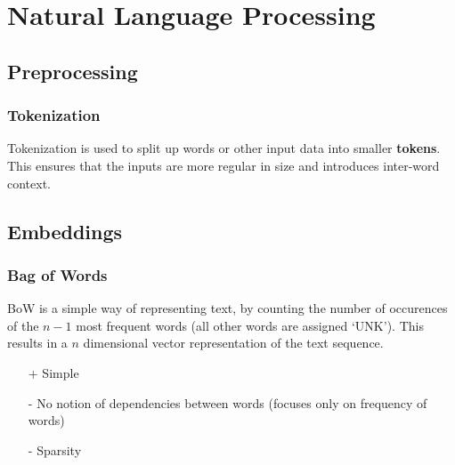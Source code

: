 \section{Natural Language Processing}
\subsection{Preprocessing}
\subsubsection{Tokenization}
Tokenization is used to split up words or other input data into smaller \textbf{tokens}. This ensures that the inputs are more regular in size and introduces inter-word context.

\subsection{Embeddings}

\subsubsection{Bag of Words}
BoW is a simple way of representing text, by counting the number of occurences of the $n-1$ most frequent words (all other words are assigned `UNK').
This results in a $n$ dimensional vector representation of the text sequence.
\begin{itemize}
    \item [+] Simple
    \item [-] No notion of dependencies between words (focuses only on frequency of words)
    \item [-] Sparsity 
\end{itemize}
